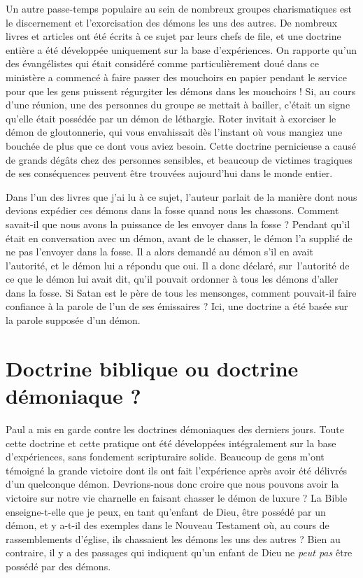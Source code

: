 Un autre passe-temps populaire au sein de nombreux groupes charismatiques
 est le discernement et l'exorcisation des démons les uns des autres.
 De nombreux livres et articles ont été écrits à ce sujet par leurs chefs de file,
 et une doctrine entière a été développée uniquement sur la base d'expériences.
 On rapporte qu'un des évangélistes qui était considéré
 comme particulièrement doué dans ce ministère a commencé à faire passer
 des mouchoirs en papier pendant le service pour que les gens puissent
 régurgiter les démons dans les mouchoirs ! Si, au cours d'une réunion,
 une des personnes du groupe se mettait à bailler, c'était un signe
 qu'elle était possédée par un démon de léthargie. Roter invitait à exorciser le
 démon de gloutonnerie, qui vous envahissait dès l'instant
 où vous mangiez une bouchée de plus que ce dont vous aviez besoin.
 Cette doctrine pernicieuse a causé de grands dégâts chez des personnes
 sensibles, et beaucoup de victimes tragiques de ses conséquences
 peuvent être trouvées aujourd'hui dans le monde entier.

Dans l'un des livres que j'ai lu à ce sujet, l'auteur parlait
 de la manière dont nous devions expédier ces démons dans la fosse
 quand nous les chassons. Comment savait-il que nous avons la puissance
 de les envoyer dans la fosse ? Pendant qu'il était en conversation
 avec un démon, avant de le chasser, le démon l'a supplié de ne pas
 l'envoyer dans la fosse. Il a alors demandé au démon s'il en avait
 l'autorité, et le démon lui a répondu que oui.
 Il a donc déclaré, sur~l'autorité de ce que le démon lui avait dit,
 qu'il pouvait ordonner à tous les démons d'aller dans la fosse.
 Si Satan  est le père de tous les mensonges,
 comment pouvait-il faire
 confiance à la parole de l'un de ses émissaires ?
 Ici, une doctrine a été basée sur la parole supposée d'un démon.


\section{Doctrine biblique ou doctrine d\'emoniaque ?}

Paul a mis en garde contre les doctrines démoniaques des derniers jours.
 Toute cette doctrine et cette pratique ont été développées intégralement
 sur la base d'expériences, sans fondement scripturaire solide.
 Beaucoup de gens m'ont témoigné la grande victoire dont ils ont fait
 l'expérience après avoir été délivrés d'un quelconque démon.
 Devrions-nous donc croire que nous pouvons avoir la victoire
 sur notre vie charnelle en faisant chasser le démon de luxure ?
 La Bible enseigne-t-elle que je peux, en tant qu'enfant~de Dieu,
 être possédé par un démon, et y a-t-il des exemples dans le Nouveau
 Testament où, au cours de rassemblements d'église, ils chassaient
 les démons les uns des autres ? Bien au contraire, il y a des passages
 qui indiquent qu'un enfant de Dieu ne \emph{peut pas} être possédé par des démons.

